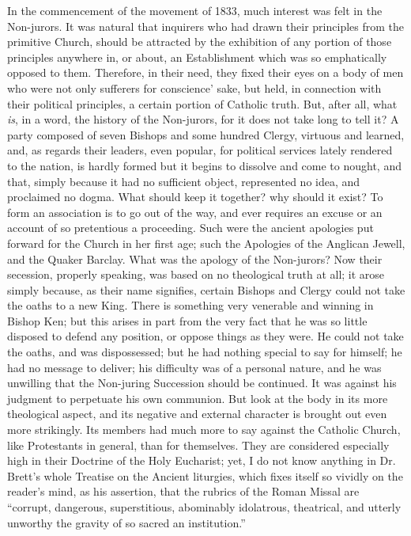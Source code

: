 In the commencement of the movement of 1833, much interest was felt
in the Non-jurors. It was natural that inquirers who had drawn their
principles from the primitive Church, should be attracted by the
exhibition of any portion of those principles anywhere in, or about,
an Establishment which was so emphatically opposed to them. Therefore,
in their need, they fixed their eyes on a body of men who were not
only sufferers for conscience' sake, but held, in connection with
their political principles, a certain portion of Catholic truth. But,
after all, what \emph{is}, in a word, the history of the Non-jurors, for it
does not take long to tell it? A party composed of seven Bishops and
some hundred Clergy, virtuous and learned, and, as regards their
leaders, even popular, for political services lately rendered to the
nation, is hardly formed but it begins to dissolve and come to nought,
and that, simply because it had no sufficient object, represented no
idea, and proclaimed no dogma. What should keep it together? why
should it exist? To form an association is to go out of the way, and
ever requires an excuse or an account of so pretentious a proceeding.
Such were the ancient apologies put forward for the Church in her
first age; such the Apologies of the Anglican Jewell, and the Quaker
Barclay. What was the apology of the Non-jurors? Now their secession,
properly speaking, was based on no theological truth at all; it arose
simply because, as their name signifies, certain Bishops and Clergy
could not take the oaths to a new King. There is something very
venerable and winning in Bishop Ken; but this arises in part from the
very fact that he was so little disposed to defend any position, or
oppose things as they were. He could not take the oaths, and was
dispossessed; but he had nothing special to say for himself; he had no
message to deliver; his difficulty was of a personal nature, and he
was unwilling that the Non-juring Succession should be continued. It
was against his judgment to perpetuate his own communion. But look at
the body in its more theological aspect, and its negative and external
character is brought out even more strikingly. Its members had much
more to say against the Catholic Church, like Protestants in general,
than for themselves. They are considered especially high in their
Doctrine of the Holy Eucharist; yet, I do not know anything in Dr.
Brett's whole Treatise on the Ancient liturgies, which fixes itself so
vividly on the reader's mind, as his assertion, that the rubrics of
the Roman Missal are ``corrupt, dangerous, superstitious, abominably idolatrous, theatrical, and utterly unworthy the gravity of
so sacred an institution.''

